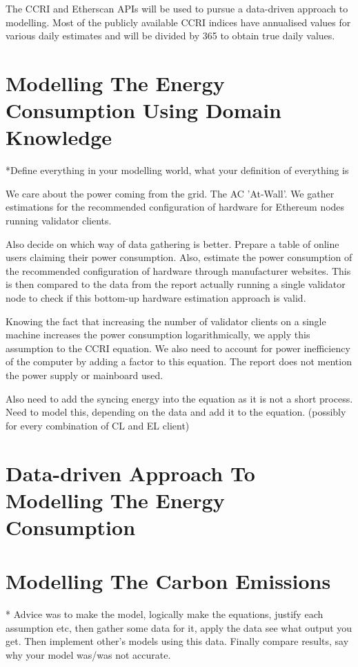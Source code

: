 The CCRI \cite{Ccri-apiOverview} and Etherscan \cite{EtherscanProvider} APIs will be used to pursue a data-driven approach to modelling. Most of the publicly available CCRI indices have annualised values for various daily estimates and will be divided by 365 to obtain true daily values. 

\section {Modelling The Energy Consumption Using Domain Knowledge}

*Define everything in your modelling world, what your definition of everything is

We care about the power coming from the grid. The AC 'At-Wall'. We gather estimations for the recommended configuration of hardware for Ethereum nodes running validator clients. 

Also decide on which way of data gathering is better. Prepare a table of online users claiming their power consumption. Also, estimate the power consumption of the recommended configuration of hardware through manufacturer websites. This is then compared to the data from the \cite{CryptoCarbonRatingsInstitute2022TheNetwork} report actually running a single validator node to check if this bottom-up hardware estimation approach is valid. 

Knowing the fact that increasing the number of validator clients on a single machine increases the power consumption logarithmically, we apply this assumption to the CCRI equation. We also need to account for power inefficiency of the computer by adding a factor to this equation. The report does not mention the power supply or mainboard used.

Also need to add the syncing energy into the equation as it is not a short process. Need to model this, depending on the data and add it to the equation. (possibly for every combination of CL and EL client)


\section {Data-driven Approach To Modelling The Energy Consumption}

\section {Modelling The Carbon Emissions }
* Advice was to make the model, logically make the equations, justify each assumption etc, then gather some data for it, apply the data see what output you get. Then implement other's models using this data. Finally compare results, say why your model was/was not accurate.


